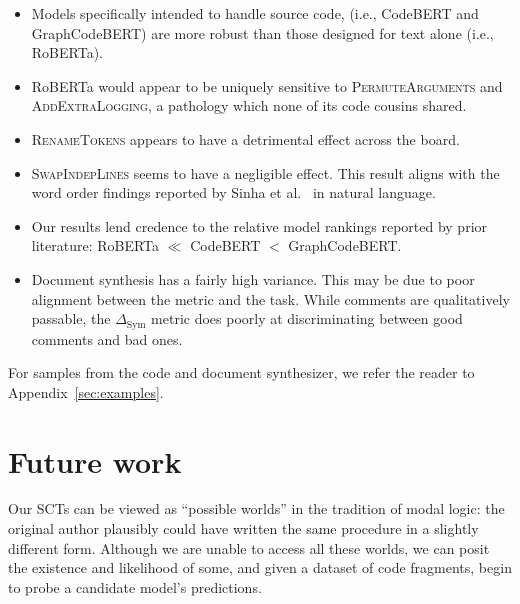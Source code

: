 \documentclass[usenames,dvipsnames]{article} %
\begin{document}
  \begin{itemize}
    \item Models specifically intended to handle source code, (i.e., CodeBERT and GraphCodeBERT) are more robust than those designed for text alone (i.e., RoBERTa).
    \item RoBERTa would appear to be uniquely sensitive to \textsc{PermuteArguments} and \textsc{AddExtraLogging}, a pathology which none of its code cousins shared.
    \item \textsc{RenameTokens} appears to have a detrimental effect across the board.
    \item \textsc{SwapIndepLines} seems to have a negligible effect. This result aligns with the word order findings reported by Sinha et al.~\citep{sinha2021masked} in natural language.
    \item Our results lend credence to the relative model rankings reported by prior literature: RoBERTa $\ll$ CodeBERT $<$ GraphCodeBERT.
    \item Document synthesis has a fairly high variance. This may be due to poor alignment between the metric and the task. While comments are qualitatively passable, the $\Delta_{\text{Sym}}$ metric does poorly at discriminating between good comments and bad ones.
  \end{itemize}

 For samples from the code and document synthesizer, we refer the reader to Appendix~\ref{sec:examples}.

  \section{Future work}


  Our SCTs can be viewed as ``possible worlds'' in the tradition of modal logic: the original author plausibly could have written the same procedure in a slightly different form. Although we are unable to access all these worlds, we can posit the existence and likelihood of some, and given a dataset of code fragments, begin to probe a candidate model's predictions.
\end{document}
